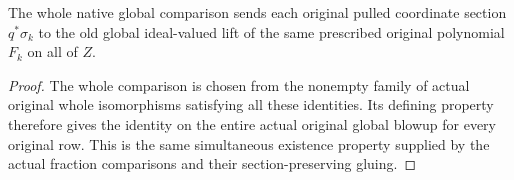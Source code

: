\begin{proposition}
\label{prop:whole-original-native-global-line-sections}
\leanok
{}
The whole native global comparison sends each original pulled coordinate section $q^*\sigma_k$ to the old global ideal-valued lift of the same prescribed original polynomial $F_k$ on all of $Z$.
\end{proposition}
\begin{proof}
The whole comparison is chosen from the nonempty family of actual original whole isomorphisms satisfying all these identities. Its defining property therefore gives the identity on the entire actual original global blowup for every original row. This is the same simultaneous existence property supplied by the actual fraction comparisons and their section-preserving gluing.
\end{proof}
